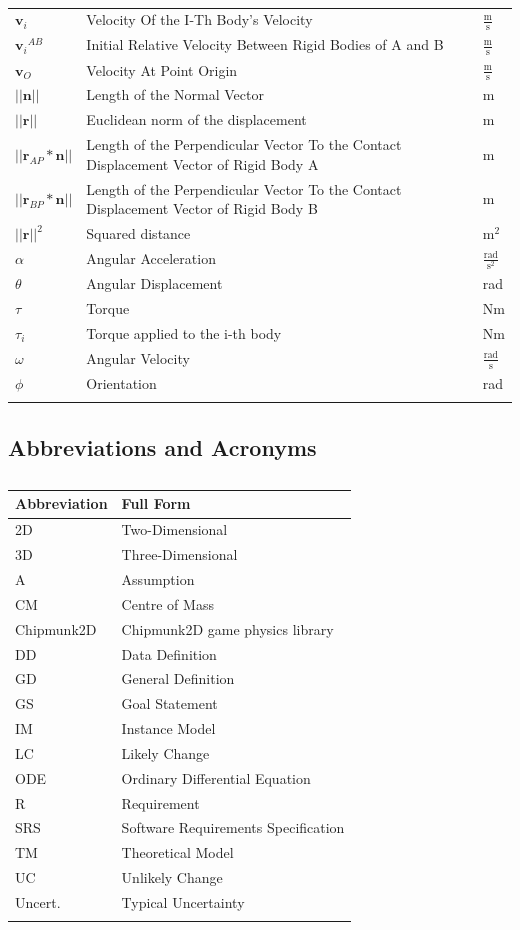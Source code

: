 \documentclass[12pt]{article}
\begin{document}
\begin{longtabu}{l X[l] l}
\\
${\mathbf{v}_{i}}$ & Velocity Of the I-Th Body's Velocity & $\frac{\text{m}}{\text{s}}$
\\
${{\mathbf{v}_{i}}^{AB}}$ & Initial Relative Velocity Between Rigid Bodies of A and B & $\frac{\text{m}}{\text{s}}$
\\
${\mathbf{v}_{O}}$ & Velocity At Point Origin & $\frac{\text{m}}{\text{s}}$
\\
$||\mathbf{n}||$ & Length of the Normal Vector & m
\\
$||\mathbf{r}||$ & Euclidean norm of the displacement & m
\\
$||{\mathbf{r}_{AP}}*\mathbf{n}||$ & Length of the Perpendicular Vector To the Contact Displacement Vector of Rigid Body A & m
\\
$||{\mathbf{r}_{BP}}*\mathbf{n}||$ & Length of the Perpendicular Vector To the Contact Displacement Vector of Rigid Body B & m
\\
${||\mathbf{r}||^{2}}$ & Squared distance & $\text{m}^{2}$
\\
$α$ & Angular Acceleration & $\frac{\text{rad}}{\text{s}^{2}}$
\\
$θ$ & Angular Displacement & rad
\\
$τ$ & Torque & Nm
\\
${τ_{i}}$ & Torque applied to the i-th body & Nm
\\
$ω$ & Angular Velocity & $\frac{\text{rad}}{\text{s}}$
\\
$ϕ$ & Orientation & rad
\\
\bottomrule
\caption{}
\label{Table:ToS}
\end{longtabu}
\subsection{Abbreviations and Acronyms}
\label{Sec:TAbbAcc}
\begin{longtable}{l l}
\toprule
\textbf{Abbreviation} & \textbf{Full Form}
\\
\midrule
\endhead
2D & Two-Dimensional
\\
3D & Three-Dimensional
\\
A & Assumption
\\
CM & Centre of Mass
\\
Chipmunk2D & Chipmunk2D game physics library
\\
DD & Data Definition
\\
GD & General Definition
\\
GS & Goal Statement
\\
IM & Instance Model
\\
LC & Likely Change
\\
ODE & Ordinary Differential Equation
\\
R & Requirement
\\
SRS & Software Requirements Specification
\\
TM & Theoretical Model
\\
UC & Unlikely Change
\\
Uncert. & Typical Uncertainty
\\
\bottomrule
\caption{}
\label{Table:TAbbAcc}
\end{longtable}
\end{document}

